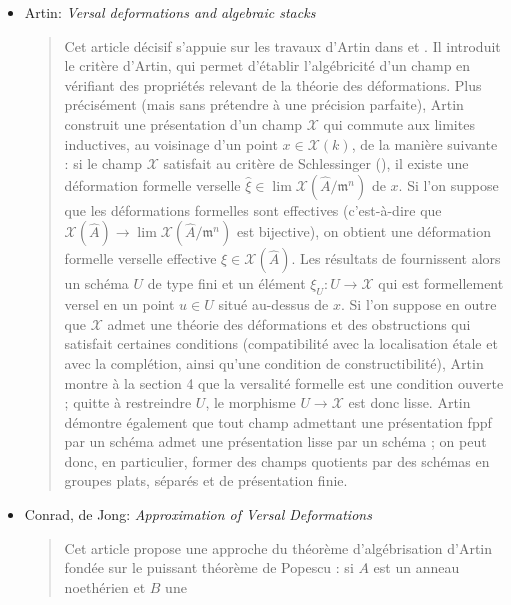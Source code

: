 \begin{itemize}
\begin{quote}
En termes imprécis, il est démontré que, si l'on peut contracter formellement un
sous-ensemble fermé $Y' \subset X'$ au voisinage de $Y'$, alors il existe un
morphisme global $X' \to X$ qui contracte $Y$, où $X$ est un espace
algébrique.
\end{quote}
\item
Artin: \emph{Versal deformations and algebraic stacks} \cite{ArtinVersal}
\begin{quote}
Cet article décisif s'appuie sur les travaux d'Artin dans
\cite{Artin-Algebraic-Approximation} et \cite{ArtinI}. Il
introduit le critère d'Artin, qui permet d'établir l'algébricité d'un
champ en vérifiant des propriétés relevant de la théorie des déformations. Plus
précisément (mais sans prétendre à une précision parfaite), Artin construit une
présentation d'un champ $\mathcal{X}$ qui commute aux limites inductives,
au voisinage d'un point $x \in \mathcal{X}(k)$, de la manière suivante : si le
champ $\mathcal{X}$
satisfait au critère de Schlessinger (\cite{Sch}), il existe une déformation
formelle verselle
$\hat{\xi} \in \lim \mathcal{X}(\hat A / \mathfrak m^n)$ de $x$.
Si l'on suppose que les déformations formelles sont effectives (c'est-à-dire que
$\mathcal{X}(\hat{A}) \to \lim \mathcal{X}(\hat A / \mathfrak m^n)$
est bijective), on obtient une déformation formelle verselle effective
$\xi \in \mathcal{X}(\hat A)$. Les résultats de
\cite{ArtinI} fournissent alors un schéma $U$ de type fini et un
élément $\xi_U: U \to \mathcal{X}$ qui est formellement versel en un point
$u \in U$ situé au-dessus de $x$. Si l'on suppose en outre que $\mathcal{X}$
admet une théorie des déformations et des obstructions
qui satisfait certaines conditions (compatibilité avec la localisation étale
et avec la complétion, ainsi qu'une condition de constructibilité), Artin montre
à la section 4 que la versalité formelle est une condition ouverte ; quitte à
restreindre $U$, le morphisme $U \to \mathcal{X}$ est donc lisse.
Artin démontre également que tout champ admettant une présentation fppf par
un schéma admet une présentation lisse par un schéma ; on peut donc, en
particulier, former des champs quotients par des schémas en groupes plats,
séparés et de présentation finie.
\end{quote}
\item Conrad, de Jong: \emph{Approximation of Versal Deformations}
\cite{conrad-dejong}
\begin{quote}
Cet article propose une approche du théorème d'algébrisation d'Artin fondée sur
le puissant théorème de Popescu : si $A$ est un anneau noethérien et $B$ une

\end{quote}
\end{itemize}
